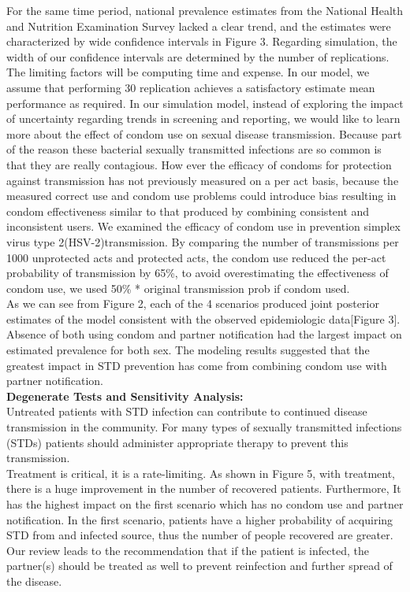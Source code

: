 \documentclass{article}
\begin{document}
\begin{normalsize}
 For the same time period, national prevalence estimates from the National Health and Nutrition Examination Survey lacked a clear trend, and the estimates were characterized by wide confidence intervals in Figure 3. Regarding simulation, the width of our confidence intervals are determined by the number of replications. The limiting factors will be computing time and expense. In our model, we assume that performing 30 replication achieves a satisfactory estimate mean performance as required. 
 In our simulation model, instead of exploring the impact of uncertainty regarding trends in screening and reporting, we would like to learn more about the effect of condom use on sexual disease transmission. Because part of the reason these bacterial sexually transmitted infections are so common is that they are really contagious.
 How ever the efficacy of condoms for protection against transmission has not previously measured on a per act basis, because the measured correct use and condom use problems could introduce bias resulting in condom effectiveness similar to that produced by combining consistent and inconsistent users.
 We examined the efficacy of condom use in prevention simplex virus type 2(HSV-2)transmission. By comparing the number of transmissions per 1000 unprotected acts and protected acts, the condom use reduced the per-act probability of transmission by 65\%, to avoid overestimating the effectiveness of condom use, we used 50\% * original transmission prob if condom used. \\
 

 
 As we can see from Figure 2, each of the 4 scenarios produced joint posterior estimates of the model consistent with the observed epidemiologic data[Figure 3]. Absence of both using condom and partner notification had the largest impact on estimated prevalence for both sex. The modeling results suggested that the greatest impact in STD prevention has come from combining condom use with partner notification.\\
 
\textbf{Degenerate Tests and Sensitivity Analysis:}\\

Untreated patients with STD infection can contribute to continued disease transmission in the community. For many types of sexually transmitted infections (STDs) patients should administer appropriate therapy to prevent this transmission. \\

 Treatment is critical, it is a rate-limiting. As shown in Figure 5, with treatment, there is a huge improvement in the number of recovered patients. Furthermore, It has the highest impact on the first scenario which has no condom use and partner notification. In the first scenario, patients have a higher probability of acquiring STD from and infected source, thus the number of people recovered are greater.  Our review leads to the recommendation that if the patient is infected, the partner(s) should be treated as well to prevent reinfection and further spread of the disease.
 

\end{normalsize}
\end{document}
